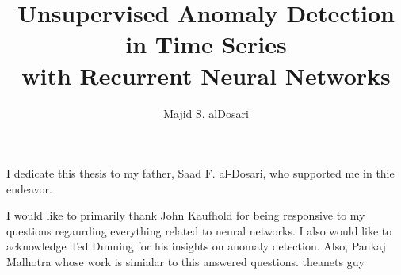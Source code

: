 \documentclass[11 pt]{report}
\begin{document}
\title{
  Unsupervised Anomaly Detection in Time Series\\
  with Recurrent Neural Networks}
\author{
Majid S. alDosari
}
\subject{(Computational Science)}







\signaturepage

\titlepage

\copyrightpage


\dedicationpage

\noindent I dedicate this thesis to my father, Saad F. al-Dosari, who supported me in thie endeavor.


\acknowledgementspage

\noindent
I would like to primarily thank John Kaufhold for being responsive to my questions regaurding everything related to neural networks. I also would like to acknowledge Ted Dunning for his insights on anomaly detection. Also, Pankaj Malhotra whose work is simialar to this answered questions. theanets guy

\end{document}
